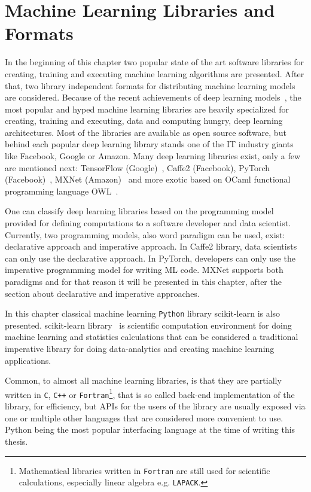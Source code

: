 \documentclass[english, 12pt, a4paper, elec, utf8, online]{aaltothesis}
\begin{document}
\newpage
\section{Machine Learning Libraries and Formats}\label{chapter:ml_practical} 
In the beginning of this chapter two popular state of the art software libraries for creating, training and executing machine learning algorithms are presented. After that, two library independent formats for distributing machine learning models are considered. Because of the recent achievements of deep learning models~\cite{tan_lim_2018}, the most popular and hyped machine learning libraries are heavily specialized for creating, training and executing, data and computing hungry, deep learning architectures. Most of the libraries are available as open source software, but behind each popular deep learning library stands one of the IT industry giants like Facebook, Google or Amazon. Many deep learning libraries exist, only a few are mentioned next: TensorFlow (Google)~\cite{abadi2016tensorflowas}, Caffe2 (Facebook), PyTorch (Facebook)~\cite{paszke2017automatic}, MXNet (Amazon)~\cite{chen2015mxnet} and more exotic based on OCaml functional programming language OWL~\cite{wang2017owl}. 

One can classify deep learning libraries based on the programming model provided for defining computations to a software developer and data scientist. Currently, two programming models, also word paradigm can be used, exist: declarative approach and imperative approach. In Caffe2 library, data scientists can only use the declarative approach. In PyTorch, developers can only use the imperative programming model for writing ML code. MXNet supports both paradigms and for that reason it will be presented in this chapter, after the section about declarative and imperative approaches. 

In this chapter classical machine learning \texttt{Python} library scikit-learn is also presented. scikit-learn library~\cite{pedregosa2011scikit} is scientific computation environment for doing machine learning and statistics calculations that can be considered a traditional imperative library for doing data-analytics and creating machine learning applications.

Common, to almost all machine learning libraries, is that they are partially written  in \texttt{C}, \texttt{C++} or \texttt{Fortran}\footnote{Mathematical libraries written in \texttt{Fortran} are still used for scientific calculations, especially linear algebra e.g. \texttt{LAPACK}.}, that is so called back-end implementation of the library, for efficiency, but APIs for the users of the library are usually exposed via one or multiple other languages that are considered more convenient to use. Python being the most popular interfacing language at the time of writing this thesis. 
\end{document}
